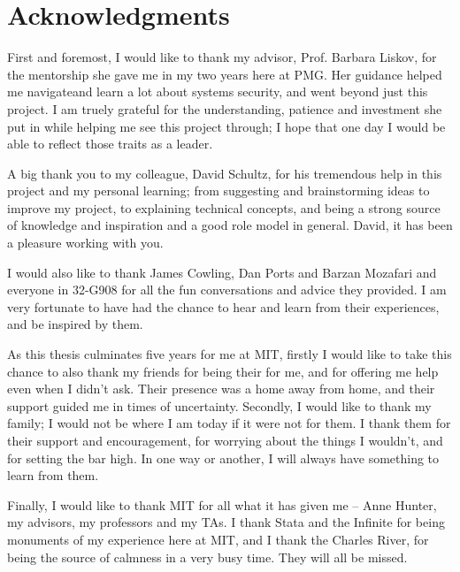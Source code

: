 % 

\cleardoublepage

\section*{Acknowledgments}

First and foremost, I would like to thank my advisor, Prof. Barbara Liskov, for the mentorship she gave me in my two years here at PMG. Her guidance helped me navigateand learn a lot about systems security, and went beyond just this project. I am truely grateful for the understanding, patience and investment she put in while helping me see this project through; I hope that one day I would be able to reflect those traits as a leader.

A big thank you to my colleague, David Schultz, for his tremendous help in this project and my personal learning; from suggesting and brainstorming ideas to improve my project, to explaining technical concepts, and being a strong source of knowledge and inspiration and a good role model in general. David, it has been a pleasure working with you.

I would also like to thank James Cowling, Dan Ports and Barzan Mozafari and everyone in 32-G908 for all the fun conversations and advice they provided. I am very fortunate to have had the chance to hear and learn from their experiences, and be inspired by them.

As this thesis culminates five years for me at MIT, firstly I would like to take this chance to also thank my friends for being their for me, and for offering me help even when I didn't ask. Their presence was a home away from home, and their support guided me in times of uncertainty. Secondly, I would like to thank my family; I would not be where I am today if it were not for them. I thank them for their support and encouragement, for worrying about the things I wouldn't, and for setting the bar high. In one way or another, I will always have something to learn from them.

Finally, I would like to thank MIT for all what it has given me -- Anne Hunter, my advisors, my professors and my TAs. I thank Stata and the Infinite for being monuments of my experience here at MIT, and I thank the Charles River, for being the source of calmness in a very busy time. They will all be missed.


